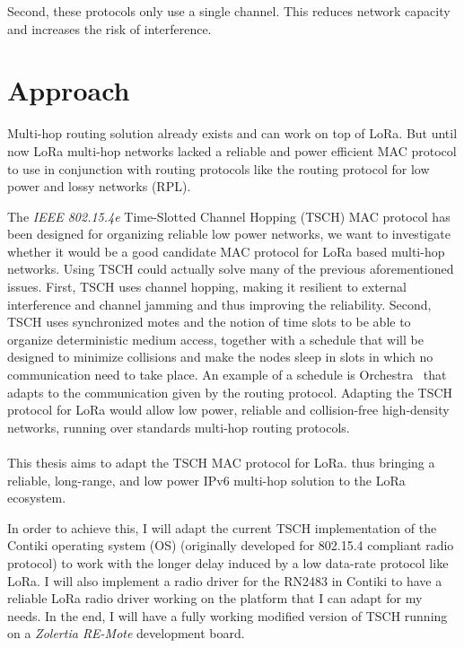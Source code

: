Second, these protocols only use a single channel.
This reduces network capacity and increases the risk of
interference.

\section{Approach}

Multi-hop routing solution already exists and can work on top of LoRa.
But until now LoRa multi-hop networks lacked a reliable and power efficient MAC protocol
to use in conjunction with routing protocols like the routing protocol for low power
and lossy networks (RPL).

The \emph{IEEE 802.15.4e} Time-Slotted Channel Hopping (TSCH) MAC protocol
has been designed for organizing reliable low power networks, we want to
investigate whether it would be a good candidate MAC protocol for LoRa based
multi-hop networks.
Using TSCH could actually solve many of the previous aforementioned issues.
First, TSCH uses channel hopping, making it resilient to external interference and
channel jamming and thus improving the reliability.
Second, TSCH uses synchronized motes and the notion of time slots to be able to organize
deterministic medium access, together with a schedule that will be designed to
minimize collisions and make the nodes sleep in slots in which no communication
need to take place.
An example of a schedule is Orchestra~\cite{duquennoy2015} that adapts to the
communication given by the routing protocol.
Adapting the TSCH protocol for LoRa would allow low power,
reliable and collision-free high-density networks, running over standards
multi-hop routing protocols.

\paragraph{}

This thesis aims to adapt the TSCH MAC protocol for LoRa.
thus bringing a reliable, long-range, and low power IPv6 multi-hop
solution to the LoRa ecosystem.

In order to achieve this, I will adapt the current TSCH implementation of
the Contiki operating system (OS) (originally developed for 802.15.4 compliant radio protocol)
to work with the longer delay induced by a low data-rate protocol like LoRa.
I will also implement a radio driver for the RN2483 in Contiki to have a
reliable LoRa radio driver working on the platform that I can adapt for my
needs.
In the end, I will have a fully working modified version of TSCH running on a
\emph{Zolertia RE-Mote} development board.


